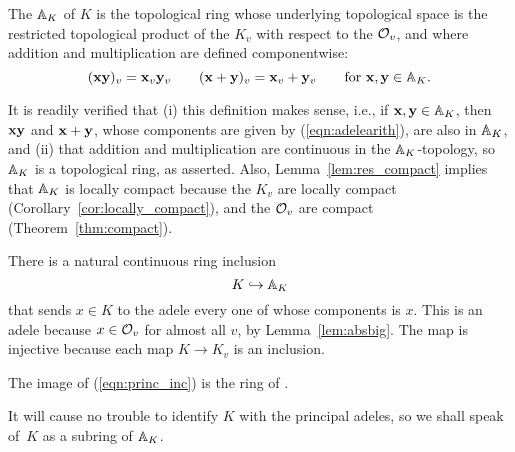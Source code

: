 \begin{definition}\label{def:adele}
  The  $\AA_K$ of $K$ is the topological ring whose
  underlying topological space is the restricted topological product
  of the $K_v$ with respect to the $\O_v$, and where addition and
  multiplication are defined componentwise:
\begin{equation}\label{eqn:adelearith}
(\bx \by)_v = \bx_v \by_v \qquad
(\bx + \by)_v = \bx_v + \by_v\qquad
\text{for }\bx, \by\in\AA_K.
\end{equation}
\end{definition}
It is readily verified that (i) this definition makes sense, i.e., if
$\bx, \by\in \AA_K$, then $\bx\by$ and $\bx+\by$, whose components are
given by (\ref{eqn:adelearith}), are also in $\AA_K$, and (ii) that
addition and multiplication are continuous in the $\AA_K$-topology, so
$\AA_K$ is a topological ring, as asserted.
Also,
Lemma~\ref{lem:res_compact} implies that $\AA_K$ is locally compact
because the $K_v$ are locally compact
(Corollary~\ref{cor:locally_compact}), and the $\O_v$ are
compact (Theorem~\ref{thm:compact}).

There is a natural continuous ring inclusion
\begin{equation}\label{eqn:princ_inc}
K\hra \AA_K
\end{equation}
that sends $x\in K$ to the adele every one of whose components is $x$.
This is an adele because $x\in \O_v$ for almost all $v$, by
Lemma~\ref{lem:absbig}.  The map is injective because each map $K\to
K_v$ is an inclusion.

\begin{definition}
  The image of (\ref{eqn:princ_inc}) is the ring of .
\end{definition}
It will cause no trouble to identify $K$ with the principal adeles, so
we shall speak of~$K$ as a subring of $\AA_K$.

